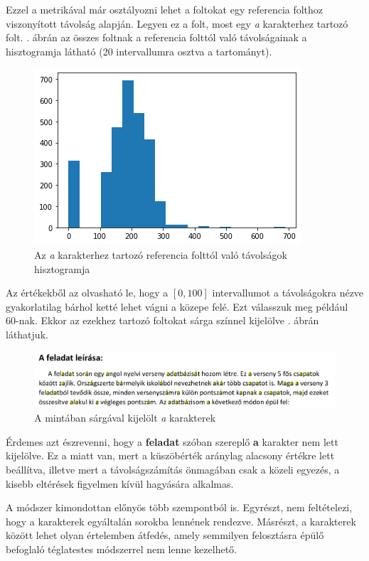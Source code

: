 Ezzel a metrikával már osztályozni lehet a foltokat egy referencia folthoz viszonyított távolság alapján.
Legyen ez a folt, most egy \emph{a} karakterhez tartozó folt.
. ábrán az összes foltnak a referencia folttól való távolságainak a hisztogramja látható (20 intervallumra osztva a tartományt).

\begin{figure}[h!]
\centering
\includegraphics[width=\textwidth]{images/a_distances.png}
\caption{Az \emph{a} karakterhez tartozó referencia folttól való távolságok hisztogramja}
\label{fig:a_distances}
\end{figure}

Az értékekből az olvasható le, hogy a $[0, 100]$ intervallumot a távolságokra nézve gyakorlatilag bárhol ketté lehet vágni a közepe felé.
Ezt válasszuk meg például 60-nak.
Ekkor az ezekhez tartozó foltokat sárga színnel kijelölve . ábrán láthatjuk.

\begin{figure}[h!]
\centering
\includegraphics[width=\textwidth]{images/a_characters.png}
\caption{A mintában sárgával kijelölt \emph{a} karakterek}
\label{fig:a_characters}
\end{figure}

Érdemes azt észrevenni, hogy a \textbf{feladat} szóban szereplő \textbf{a} karakter nem lett kijelölve.
Ez a miatt van, mert a küszöbérték aránylag alacsony értékre lett beállítva, illetve mert a távolságszámítás önmagában csak a közeli egyezés, a kisebb eltérések figyelmen kívül hagyására alkalmas.

A módszer kimondottan előnyös több szempontból is.
Egyrészt, nem feltételezi, hogy a karakterek egyáltalán sorokba lennének rendezve.
Másrészt, a karakterek között lehet olyan értelemben átfedés, amely semmilyen felosztásra épülő befoglaló téglatestes módszerrel nem lenne kezelhető.
